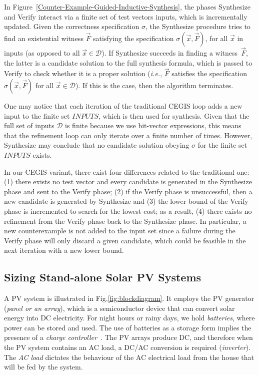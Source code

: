 \documentclass[runningheads]{llncs}
\begin{document}
In Figure~\ref{Counter-Example-Guided-Inductive-Synthesis}, the phases {\sc Synthesize} and {\sc Verify} interact via a finite set of test vectors {\sc inputs}, which is incrementally updated. Given the correctness specification $\sigma$, the {\sc Synthesize} procedure tries to find an existential witness $\vec{F}$ satisfying the specification $\sigma(\vec{x}, \vec{F})$, for all $\vec{x}$ in {\sc inputs} (as opposed to all $\vec{x} \in \mathcal{D}$). If {\sc Synthesize} succeeds in finding a witness~$\vec{F}$, the latter is a candidate solution to the full synthesis formula, which is passed to {\sc Verify} to check whether it is a proper solution ({\it i.e.}, $\vec{F}$ satisfies the specification $\sigma(\vec{x}, \vec{F})$ for all $\vec{x}\in\mathcal{D}$). If this is the case, then the algorithm terminates.

One may notice that each iteration of the traditional CEGIS loop adds a new input to the finite set $INPUTS$, which is then used for synthesis. Given that the full set of inputs $\mathcal{D}$ is finite because we use bit-vector expressions, this means that the refinement loop can only iterate over a finite number of times. However, {\sc Synthesize} may conclude that no candidate solution obeying $\sigma$ for the finite set $INPUTS$ exists. 

In our CEGIS variant, there exist four differences related to the traditional one: 
(1) there exists no test vector and every candidate is generated in the {\sc Synthesize} phase and sent to the {\sc Verify} phase; 
(2) if the {\sc Verify} phase is unsuccessful, then a new candidate is generated by {\sc Synthesize} and 
(3) the lower bound of the {\sc Verify} phase is incremented to search for the lowest cost; as a result,
(4) there exists no refinement from the {\sc Verify} phase back to the {\sc Synthesize} phase. In particular, a new counterexample is not added to the {\sc input} set since a failure during the {\sc Verify} phase will only discard a given candidate, which could be feasible in the next iteration with a new lower bound.

\subsection{Sizing Stand-alone Solar PV Systems}
\label{sec:sizing}

A PV system is illustrated in Fig.\ref{fig:blockdiagram}. It employs the PV generator (\textit{panel or an array}), which is a semiconductor device that can convert solar energy into DC electricity. For night hours or rainy days, we hold \textit{batteries}, where power can be stored and used. The use of batteries as a storage form implies the presence of a \textit{charge controller}~\cite{Hansen}. The PV arrays produce DC, and therefore when the PV system contains an AC load, a DC/AC conversion is required (\textit{inverter}). The \textit{AC load} dictates the behaviour of the AC electrical load from the house that will be fed by the system.
\end{document}
